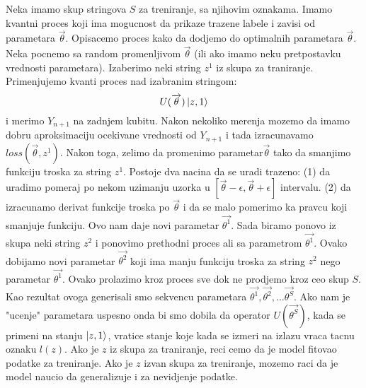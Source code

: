 \documentclass[12pt, letterpaper, oneside]{article}
\begin{document}
Neka imamo skup stringova $S$ za treniranje, sa njihovim oznakama. Imamo kvantni proces koji ima mogucnost da
prikaze trazene labele i zavisi od parametara $\overrightarrow{\theta}$. Opisacemo proces kako da dodjemo do optimalnih parametara $\overrightarrow{\theta}$.
Neka pocnemo sa random promenljivom $\overrightarrow{\theta}$ (ili ako imamo neku pretpostavku vrednosti parametara). Izaberimo neki string $z^1$ iz skupa za traniranje.
Primenjujemo kvanti proces nad izabranim stringom:
\[
    U(\overrightarrow{\theta})\Ket{z,1}
\] 
i merimo $Y_{n+1}$ na zadnjem kubitu. Nakon nekoliko merenja mozemo da imamo dobru aproksimaciju ocekivane vrednosti od $Y_{n+1}$
i tada izracunavamo $\mathit{loss}(\overrightarrow{\theta},z^1)$. Nakon toga, zelimo da promenimo parametar$\overrightarrow{\theta}$ tako da smanjimo
funkciju troska za string $z^1$. Postoje dva nacina da se uradi trazeno: (1) da uradimo pomeraj po nekom uzimanju uzorka u $[\overrightarrow{\theta}-\epsilon,\overrightarrow{\theta}+\epsilon]$ intervalu.
(2) da izracunamo derivat funkcije troska po $\overrightarrow{\theta}$ i da se malo pomerimo ka pravcu koji smanjuje funkciju.
Ovo nam daje novi parametar $\overrightarrow{\theta^1}$. Sada biramo ponovo iz skupa neki string $z^2$ i ponovimo prethodni proces ali sa parametrom $\overrightarrow{\theta^1}$.
Ovako dobijamo novi parametar $\overrightarrow{\theta^2}$ koji ima manju funkciju troska za string $z^2$ nego parametar $\overrightarrow{\theta^1}$.
Ovako prolazimo kroz proces sve dok ne prodjemo kroz ceo skup $S$. Kao rezultat ovoga generisali smo sekvencu parametara
$\overrightarrow{\theta^1}, \overrightarrow{\theta^2}, \dots \overrightarrow{\theta^S}$. Ako nam je "ucenje" parametara uspesno onda bi smo dobila
da operator $U(\overrightarrow{\theta^S})$, kada se primeni na stanju $\Ket{z,1}$, vratice stanje koje kada se izmeri na izlazu vraca tacnu oznaku $l(z)$.
Ako je $z$ iz skupa za traniranje, reci cemo da je model fitovao podatke za treniranje. Ako je $z$ izvan skupa za treniranje, mozemo raci da je model naucio da generalizuje i za nevidjenje podatke.
\end{document}
